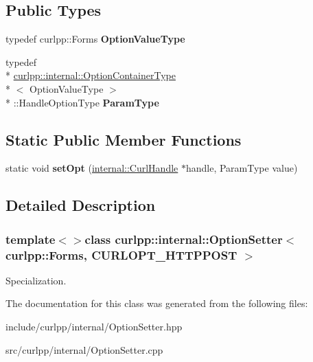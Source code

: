 \subsection*{Public Types}
\begin{DoxyCompactItemize}
\item 
\hypertarget{classcurlpp_1_1internal_1_1OptionSetter_3_01curlpp_1_1Forms_00_01CURLOPT__HTTPPOST_01_4_a2a886303dee5881d9a9014f8a3108cc4}{typedef curlpp\-::\-Forms {\bfseries Option\-Value\-Type}}\label{classcurlpp_1_1internal_1_1OptionSetter_3_01curlpp_1_1Forms_00_01CURLOPT__HTTPPOST_01_4_a2a886303dee5881d9a9014f8a3108cc4}

\item 
\hypertarget{classcurlpp_1_1internal_1_1OptionSetter_3_01curlpp_1_1Forms_00_01CURLOPT__HTTPPOST_01_4_ae45e51bf81ac4425a5297ff384d1b671}{typedef \\*
\hyperlink{structcurlpp_1_1internal_1_1OptionContainerType}{curlpp\-::internal\-::\-Option\-Container\-Type}\\*
$<$ Option\-Value\-Type $>$\\*
\-::Handle\-Option\-Type {\bfseries Param\-Type}}\label{classcurlpp_1_1internal_1_1OptionSetter_3_01curlpp_1_1Forms_00_01CURLOPT__HTTPPOST_01_4_ae45e51bf81ac4425a5297ff384d1b671}

\end{DoxyCompactItemize}
\subsection*{Static Public Member Functions}
\begin{DoxyCompactItemize}
\item 
\hypertarget{classcurlpp_1_1internal_1_1OptionSetter_3_01curlpp_1_1Forms_00_01CURLOPT__HTTPPOST_01_4_ad507282ace2f6b393d66770d511d1830}{static void {\bfseries set\-Opt} (\hyperlink{classcurlpp_1_1internal_1_1CurlHandle}{internal\-::\-Curl\-Handle} $\ast$handle, Param\-Type value)}\label{classcurlpp_1_1internal_1_1OptionSetter_3_01curlpp_1_1Forms_00_01CURLOPT__HTTPPOST_01_4_ad507282ace2f6b393d66770d511d1830}

\end{DoxyCompactItemize}


\subsection{Detailed Description}
\subsubsection*{template$<$$>$class curlpp\-::internal\-::\-Option\-Setter$<$ curlpp\-::\-Forms, C\-U\-R\-L\-O\-P\-T\-\_\-\-H\-T\-T\-P\-P\-O\-S\-T $>$}

Specialization. 

The documentation for this class was generated from the following files\-:\begin{DoxyCompactItemize}
\item 
include/curlpp/internal/Option\-Setter.\-hpp\item 
src/curlpp/internal/Option\-Setter.\-cpp\end{DoxyCompactItemize}
